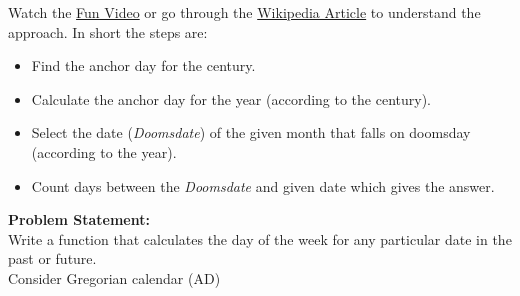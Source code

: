 Watch the \href{https://youtu.be/z2x3SSBVGJU}{Fun Video} or go through the \href{https://en.wikipedia.org/wiki/Doomsday_rule}{Wikipedia Article} to understand the approach. In short the steps are:
\begin{itemize}
\item Find the anchor day for the century.
\item Calculate the anchor day for the year (according to the century).
\item Select the date (\emph{Doomsdate}) of the given month that falls on doomsday (according to the year).
\item Count days between the \emph{Doomsdate} and given date which gives the answer.
\end{itemize}
\textbf{Problem Statement:}\\
Write a function that calculates the day of the week for any particular date in the past or future.\\
Consider Gregorian calendar (AD)

